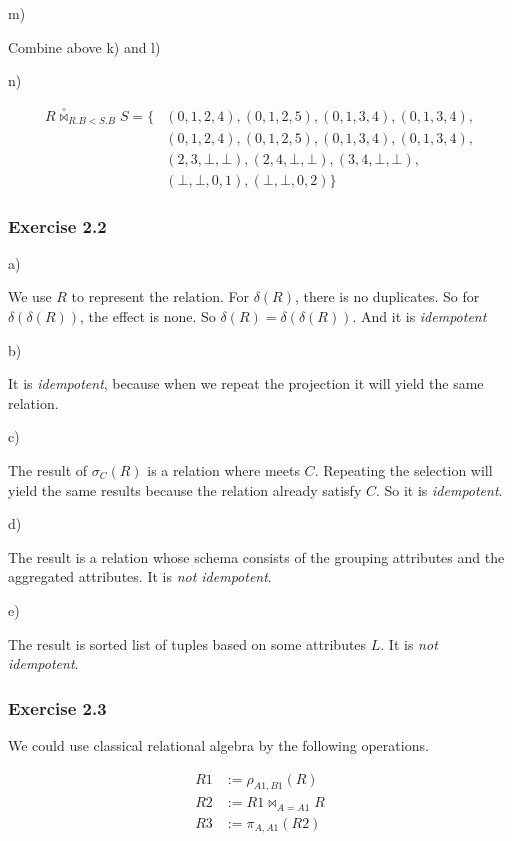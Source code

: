 \documentclass[../../main.tex]{subfiles}
\begin{document}
m)

Combine above k) and l)

n)

\begin{align*}
  R \overset{\circ}{\bowtie}_{R.B < S.B} S = \{&(0, 1, 2, 4),
    (0, 1, 2, 5), (0, 1, 3, 4), (0, 1, 3, 4), \\
    &(0, 1, 2, 4), (0, 1, 2, 5), (0, 1, 3, 4), (0, 1, 3, 4), \\
    &(2, 3, \bot, \bot), (2, 4, \bot, \bot), (3 ,4, \bot, \bot), \\
    &(\bot, \bot, 0, 1), (\bot, \bot, 0, 2)\}
\end{align*}

\subsubsection*{Exercise 2.2}

a)

We use $R$ to represent the relation. For $\delta(R)$, there
is no duplicates. So for $\delta(\delta(R))$, the effect is none.
So $\delta(R) = \delta(\delta(R))$. And it is \emph{idempotent}

b)

It is \emph{idempotent}, because when we repeat the projection
it will yield the same relation.

c)

The result of $\sigma_{C}(R)$ is a relation where meets $C$.
Repeating the selection will yield the same results because
the relation already satisfy $C$. So it is \emph{idempotent}.



d)

The result is a relation whose schema consists of the grouping
attributes and the aggregated attributes. It is
\emph{not idempotent}.

e)

The result is sorted list of tuples based on some attributes $L$.
It is \emph{not idempotent}.

\subsubsection*{Exercise 2.3}

We could use classical relational algebra by the following operations.

\begin{align*}
  R1 &:= \rho_{A1, B1}(R) \\
  R2 &:= R1 \bowtie_{A = A1} R \\
  R3 &:= \pi_{A, A1}(R2)
\end{align*}
\end{document}
